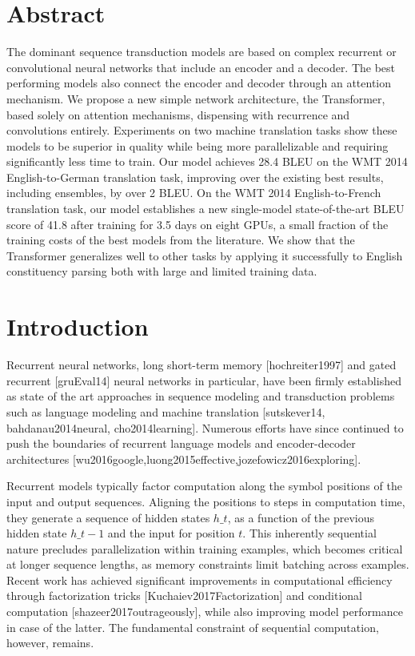\documentclass[11pt,a4paper]{article}
\begin{document}
\section{Abstract}

The dominant sequence transduction models are based on complex recurrent or convolutional neural networks that include an encoder and a decoder. The best performing models also connect the encoder and decoder through an attention mechanism. We propose a new simple network architecture, the Transformer, based solely on attention mechanisms, dispensing with recurrence and convolutions entirely. Experiments on two machine translation tasks show these models to be superior in quality while being  more parallelizable and requiring significantly less time to train. Our model achieves 28.4 BLEU on the WMT 2014 English-to-German translation task, improving over the existing best results, including ensembles, by over 2 BLEU.  On the WMT 2014 English-to-French translation task, our model establishes a new single-model state-of-the-art BLEU score of 41.8 after training for 3.5 days on eight GPUs, a small fraction of the training costs of the best models from the literature. We show that the Transformer generalizes well to other tasks by applying it successfully to English constituency parsing  both with large and limited training data.

\section{Introduction}

Recurrent neural networks, long short-term memory [hochreiter1997] and gated recurrent [gruEval14] neural networks in particular, have been firmly established as state of the art approaches in sequence modeling and transduction problems such as language modeling and machine translation [sutskever14, bahdanau2014neural, cho2014learning]. Numerous efforts have since continued to push the boundaries of recurrent language models and encoder-decoder architectures [wu2016google,luong2015effective,jozefowicz2016exploring].

Recurrent models typically factor computation along the symbol positions of the input and output sequences. Aligning the positions to steps in computation time, they generate a sequence of hidden states $h\_t$, as a function of the previous hidden state $h\_{t-1}$ and the input for position $t$. This inherently sequential nature precludes parallelization within training examples, which becomes critical at longer sequence lengths, as memory constraints limit batching across examples.
Recent work has achieved significant improvements in computational efficiency through factorization tricks [Kuchaiev2017Factorization] and conditional computation [shazeer2017outrageously], while also improving model performance in case of the latter. The fundamental constraint of sequential computation, however, remains.
\end{document}
